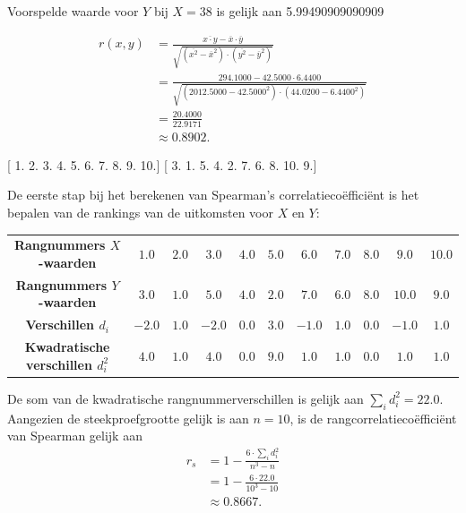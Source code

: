 \documentclass{article}
\begin{document}
Voorspelde waarde voor $Y$ bij $X = 38$ is gelijk aan 5.99490909090909

        \begin{align*}
            r(x,y)  &= \frac{ \overline{x \cdot y} - \overline{x} \cdot \overline{y} }{ \sqrt{ (\overline{x^2} - \overline{x}^2) \cdot (\overline{y^2} - \overline{y}^2) } }\\
                    &= \frac{ 294.1000 - 42.5000 \cdot 6.4400 }{ \sqrt{ (2012.5000 - 42.5000^2) \cdot (44.0200 - 6.4400^2) } } \\
                    &= \frac{20.4000}{22.9171} \\
                    &\approx 0.8902.
        \end{align*}
    
[ 1.  2.  3.  4.  5.  6.  7.  8.  9. 10.] [ 3.  1.  5.  4.  2.  7.  6.  8. 10.  9.]

        De eerste stap bij het berekenen van Spearman's correlatieco\"effici\"ent is het bepalen van de rankings van de uitkomsten voor $X$ en $Y$:
        \begin{center}
            \begin{tabular}{ccccccccccc}
                \toprule
                    {\bfseries Rangnummers $X$-waarden} & $1.0$ & $2.0$ & $3.0$ & $4.0$ & $5.0$ & $6.0$ & $7.0$ & $8.0$ & $9.0$ & $10.0$ \\
                    {\bfseries Rangnummers $Y$-waarden} & $3.0$ & $1.0$ & $5.0$ & $4.0$ & $2.0$ & $7.0$ & $6.0$ & $8.0$ & $10.0$ & $9.0$ \\
                \midrule
                    {\bfseries Verschillen $d_i$} & $-2.0$ & $1.0$ & $-2.0$ & $0.0$ & $3.0$ & $-1.0$ & $1.0$ & $0.0$ & $-1.0$ & $1.0$ \\
                    {\bfseries Kwadratische verschillen $d_i^2$} & $4.0$ & $1.0$ & $4.0$ & $0.0$ & $9.0$ & $1.0$ & $1.0$ & $0.0$ & $1.0$ & $1.0$ \\
                \bottomrule
            \end{tabular}
        \end{center}

        De som van de kwadratische rangnummerverschillen is gelijk aan $\sum_i d_i^2 = 22.0$.
        Aangezien de steekproefgrootte gelijk is aan $n = 10$, is de rangcorrelatieco\"effici\"ent van Spearman gelijk aan
        \begin{align*}
            r_s &= 1 - \frac{ 6 \cdot \sum_i d_i^2 }{ n^3 - n }  \\
                &= 1 - \frac{ 6 \cdot 22.0 }{ 10^3 - 10 }  \\
                &\approx 0.8667.
        \end{align*}
    
\end{document}
